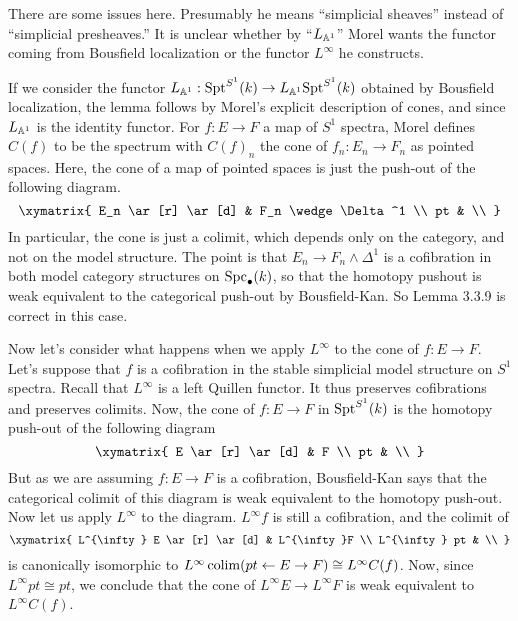 \documentclass{amsart}%
\begin{document}
There are some issues here. Presumably he means ``simplicial sheaves''
instead of ``simplicial presheaves.'' It is unclear whether by
``$L_{\mathbb{A}^1}$'' Morel wants the functor coming from Bousfield
localization or the functor $L^{\infty}$ he constructs. 

If we consider the functor
$L_{\mathbb{A}^1} : \mathrm{Spt}^{S^1}(k) \to L_{\mathbb{A}^1}\mathrm{Spt}^{S^1}(k)$ obtained by
Bousfield localization, the lemma follows by Morel's explicit
description of cones, and since $L_{\mathbb{A}^1}$ is the identity
functor. For $f : E \to F$ a map of $S^1$ spectra, Morel defines
$C(f)$ to be the spectrum with $C(f)_n$ the cone of
$f_n : E_n \to F_n$ as pointed spaces. Here, the cone of a map of pointed spaces is just the push-out of the following diagram.
\begin{equation*}
  \xymatrix{
    E_n \ar[r] \ar[d] & F_n \wedge \Delta^1 \\
    pt & \\
    }
\end{equation*}
In particular, the cone is just a colimit, which depends only on the
category, and not on the model structure. The point is that
$E_n \to F_n \wedge \Delta^1$ is a cofibration in both model category
structures on $\mathrm{Spc}_{\bullet}(k)$, so that the homotopy pushout is
weak equivalent to the categorical push-out by Bousfield-Kan. So Lemma
3.3.9 is correct in this case. 

Now let's consider what happens when we apply $L^{\infty}$ to the cone
of $f : E \to F$. Let's suppose that $f$ is a cofibration in the
stable simplicial model structure on $S^1$ spectra. Recall that
$L^{\infty}$ is a left Quillen functor. It thus preserves cofibrations
and preserves colimits. Now, the cone of $f : E \to F$ in
$\mathrm{Spt}^{S^1}(k)$ is the homotopy push-out of the following diagram
\begin{equation*}
  \xymatrix{
    E \ar[r] \ar[d] & F \\
    pt & \\
    }
\end{equation*}
But as we are assuming $f : E \to F$ is a cofibration, Bousfield-Kan
says that the categorical colimit of this diagram is weak equivalent
to the homotopy push-out. Now let us apply $L^{\infty}$ to the
diagram. $L^{\infty} f$ is still a cofibration, and the colimit of 
\begin{equation*}
  \xymatrix{
    L^{\infty} E \ar[r] \ar[d] & L^{\infty}F \\
    L^{\infty} pt & \\
    }
\end{equation*}
is canonically isomorphic to
$L^{\infty}\operatorname{colim} (pt \leftarrow E \to F) \cong L^{\infty}C(f)$.
Now, since $L^{\infty}pt \cong pt$, we conclude that the cone of
$L^{\infty} E \to L^{\infty} F$ is weak equivalent to
$L^{\infty}C(f)$.
\end{document}
